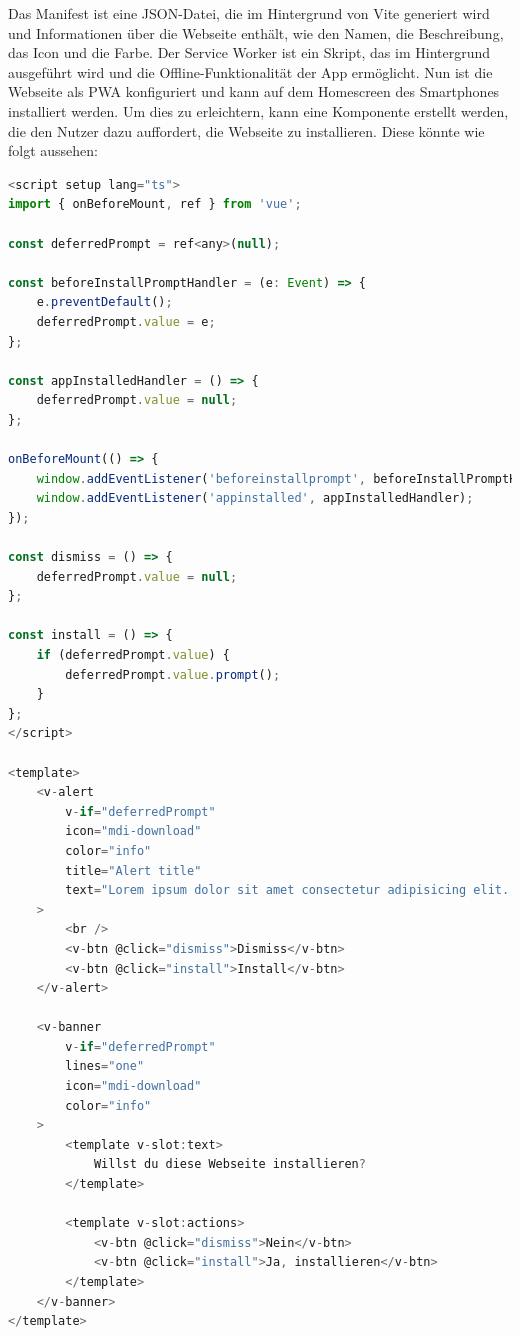 Das Manifest ist eine JSON-Datei, die im Hintergrund von Vite generiert wird und Informationen über die Webseite enthält, wie den Namen, die Beschreibung, das Icon und die Farbe. Der Service Worker ist ein Skript, das im Hintergrund ausgeführt wird und die Offline-Funktionalität der App ermöglicht. Nun ist die Webseite als \acs{PWA} konfiguriert und kann auf dem Homescreen des Smartphones installiert werden. Um dies zu erleichtern, kann eine Komponente erstellt werden, die den Nutzer dazu auffordert, die Webseite zu installieren. Diese könnte wie folgt aussehen:

\begin{lstlisting}[language={JavaScript}, caption={PWA Vue Komponente}]
<script setup lang="ts">
import { onBeforeMount, ref } from 'vue';

const deferredPrompt = ref<any>(null);

const beforeInstallPromptHandler = (e: Event) => {
    e.preventDefault();
    deferredPrompt.value = e;
};

const appInstalledHandler = () => {
    deferredPrompt.value = null;
};

onBeforeMount(() => {
    window.addEventListener('beforeinstallprompt', beforeInstallPromptHandler);
    window.addEventListener('appinstalled', appInstalledHandler);
});

const dismiss = () => {
    deferredPrompt.value = null;
};

const install = () => {
    if (deferredPrompt.value) {
        deferredPrompt.value.prompt();
    }
};
</script>

<template>
    <v-alert
        v-if="deferredPrompt"
        icon="mdi-download"
        color="info"
        title="Alert title"
        text="Lorem ipsum dolor sit amet consectetur adipisicing elit. Commodi, ratione debitis quis est labore voluptatibus! Eaque cupiditate minima, at placeat totam, magni doloremque veniam neque porro libero rerum unde voluptatem!"
    >
        <br />
        <v-btn @click="dismiss">Dismiss</v-btn>
        <v-btn @click="install">Install</v-btn>
    </v-alert>

    <v-banner
        v-if="deferredPrompt"
        lines="one"
        icon="mdi-download"
        color="info"
    >
        <template v-slot:text>
            Willst du diese Webseite installieren?
        </template>

        <template v-slot:actions>
            <v-btn @click="dismiss">Nein</v-btn>
            <v-btn @click="install">Ja, installieren</v-btn>
        </template>
    </v-banner>
</template>

\end{lstlisting}

